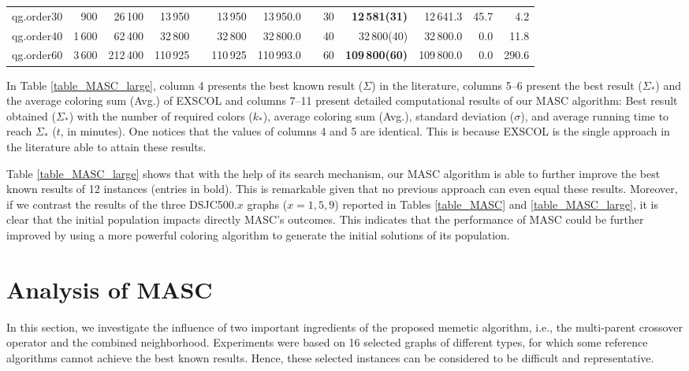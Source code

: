 \documentclass{elsart}
\begin{document}
\begin{table}
\begin{scriptsize}
\begin{tabular}{lrrrcrrcrrrrr}
qg.order30    & 900 & 26\,100 &13\,950 &&13\,950 &13\,950.0 &&30&  \textbf{12\,581(31)} & 12\,641.3&45.7 & 4.2\\
qg.order40    &1\,600 &62\,400 &32\,800 &&32\,800 &32\,800.0 &&40&  32\,800(40)& 32\,800.0&0.0 & 11.8 \\
qg.order60    & 3\,600 & 212\,400 &110\,925 &&110\,925 &110\,993.0 &&60&  \textbf{109\,800(60)} &109\,800.0 &0.0 &290.6  \\

\hline
\end{tabular}
\end{scriptsize}
\end{table}

In Table \ref{table_MASC_large}, column 4 presents the best known result ($\Sigma$) in the literature, columns 5--6 present the best result ($\Sigma_*$) and the average coloring sum (Avg.) of EXSCOL and columns 7--11 present detailed computational results of our MASC algorithm: Best result obtained ($\Sigma_*$) with the number of required colors ($k_*$), average coloring sum (Avg.), standard deviation ($\sigma$), and average running time to reach $\Sigma_*$ ($t$, in minutes). One notices that the values of columns 4 and 5 are identical. This is because EXSCOL is the single approach in the literature able to attain these results. 


Table \ref{table_MASC_large} shows that with the help of its search mechanism, our MASC algorithm is able to further improve the best known results of 12 instances (entries in bold). This is remarkable given that no previous approach can even equal these results. Moreover, if we contrast the results of the three DSJC500.$x$ graphs ($x=1,5,9$)  reported in Tables \ref{table_MASC} and \ref{table_MASC_large}, it is clear that the initial population impacts directly MASC's outcomes. This indicates that the performance of MASC could be further improved by using a more powerful coloring algorithm to generate the initial solutions of its population.

\section{Analysis of MASC}
\label{Sec_analysis_MASC}

In this section, we investigate the influence of two important ingredients of the proposed memetic algorithm, i.e., the multi-parent crossover operator and the combined neighborhood. Experiments were based on 16 selected graphs of different types, for which some reference algorithms cannot achieve the best known results. Hence, these selected instances can be considered to be difficult and representative.
\end{document}
